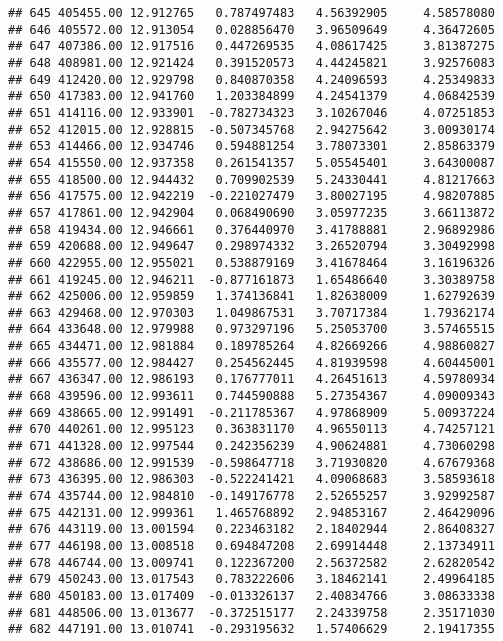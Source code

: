 \documentclass[
]{article}
\begin{document}
\begin{verbatim}
## 645 405455.00 12.912765   0.787497483   4.56392905     4.58578080
## 646 405572.00 12.913054   0.028856470   3.96509649     4.36472605
## 647 407386.00 12.917516   0.447269535   4.08617425     3.81387275
## 648 408981.00 12.921424   0.391520573   4.44245821     3.92576083
## 649 412420.00 12.929798   0.840870358   4.24096593     4.25349833
## 650 417383.00 12.941760   1.203384899   4.24541379     4.06842539
## 651 414116.00 12.933901  -0.782734323   3.10267046     4.07251853
## 652 412015.00 12.928815  -0.507345768   2.94275642     3.00930174
## 653 414466.00 12.934746   0.594881254   3.78073301     2.85863379
## 654 415550.00 12.937358   0.261541357   5.05545401     3.64300087
## 655 418500.00 12.944432   0.709902539   5.24330441     4.81217663
## 656 417575.00 12.942219  -0.221027479   3.80027195     4.98207885
## 657 417861.00 12.942904   0.068490690   3.05977235     3.66113872
## 658 419434.00 12.946661   0.376440970   3.41788881     2.96892986
## 659 420688.00 12.949647   0.298974332   3.26520794     3.30492998
## 660 422955.00 12.955021   0.538879169   3.41678464     3.16196326
## 661 419245.00 12.946211  -0.877161873   1.65486640     3.30389758
## 662 425006.00 12.959859   1.374136841   1.82638009     1.62792639
## 663 429468.00 12.970303   1.049867531   3.70717384     1.79362174
## 664 433648.00 12.979988   0.973297196   5.25053700     3.57465515
## 665 434471.00 12.981884   0.189785264   4.82669266     4.98860827
## 666 435577.00 12.984427   0.254562445   4.81939598     4.60445001
## 667 436347.00 12.986193   0.176777011   4.26451613     4.59780934
## 668 439596.00 12.993611   0.744590888   5.27354367     4.09009343
## 669 438665.00 12.991491  -0.211785367   4.97868909     5.00937224
## 670 440261.00 12.995123   0.363831170   4.96550113     4.74257121
## 671 441328.00 12.997544   0.242356239   4.90624881     4.73060298
## 672 438686.00 12.991539  -0.598647718   3.71930820     4.67679368
## 673 436395.00 12.986303  -0.522241421   4.09068683     3.58593618
## 674 435744.00 12.984810  -0.149176778   2.52655257     3.92992587
## 675 442131.00 12.999361   1.465768892   2.94853167     2.46429096
## 676 443119.00 13.001594   0.223463182   2.18402944     2.86408327
## 677 446198.00 13.008518   0.694847208   2.69914448     2.13734911
## 678 446744.00 13.009741   0.122367200   2.56372582     2.62820542
## 679 450243.00 13.017543   0.783222606   3.18462141     2.49964185
## 680 450183.00 13.017409  -0.013326137   2.40834766     3.08633338
## 681 448506.00 13.013677  -0.372515177   2.24339758     2.35171030
## 682 447191.00 13.010741  -0.293195632   1.57406629     2.19417355

\end{verbatim}
\end{document}
